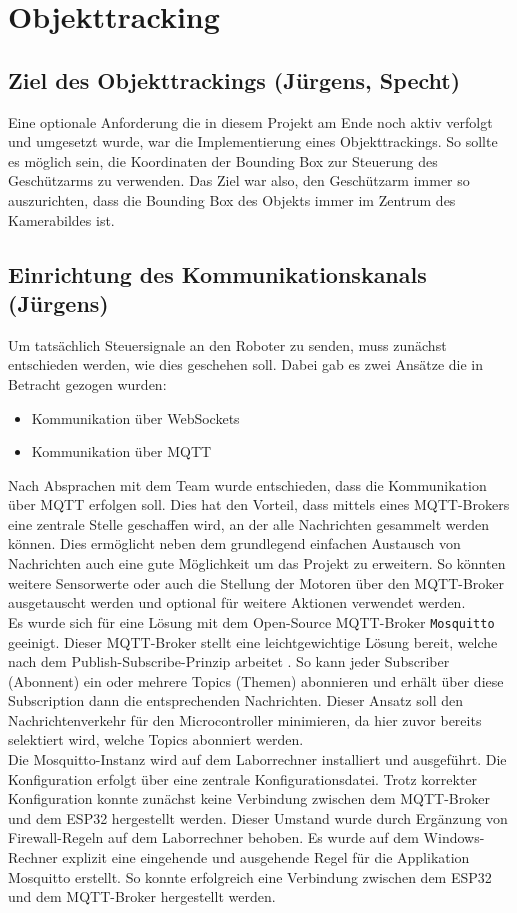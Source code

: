 \chapter{Objekttracking}
\section{Ziel des Objekttrackings (Jürgens, Specht)}
Eine optionale Anforderung die in diesem Projekt am Ende noch aktiv verfolgt und umgesetzt wurde, war die Implementierung eines Objekttrackings. So sollte es möglich sein, die Koordinaten der Bounding Box zur Steuerung des Geschützarms zu verwenden. Das Ziel war also, den Geschützarm immer so auszurichten, dass die Bounding Box des Objekts immer im Zentrum des Kamerabildes ist. 

\section{Einrichtung des Kommunikationskanals (Jürgens)}
Um tatsächlich Steuersignale an den Roboter zu senden, muss zunächst entschieden werden, wie dies geschehen soll. Dabei gab es zwei Ansätze die in Betracht gezogen wurden: 
\begin{itemize}
    \item Kommunikation über WebSockets
    \item Kommunikation über MQTT
\end{itemize}
Nach Absprachen mit dem Team wurde entschieden, dass die Kommunikation über MQTT erfolgen soll. Dies hat den Vorteil, dass mittels eines MQTT-Brokers eine zentrale Stelle geschaffen wird, an der alle Nachrichten gesammelt werden können. Dies ermöglicht neben dem grundlegend einfachen Austausch von Nachrichten auch eine gute Möglichkeit um das Projekt zu erweitern. So könnten weitere Sensorwerte oder auch die Stellung der Motoren über den MQTT-Broker ausgetauscht werden und optional für weitere Aktionen verwendet werden. \\

Es wurde sich für eine Lösung mit dem Open-Source MQTT-Broker \texttt{Mosquitto} geeinigt. Dieser MQTT-Broker stellt eine leichtgewichtige Lösung bereit, welche nach dem Publish-Subscribe-Prinzip arbeitet \cite{Mosquitto}. So kann jeder Subscriber (Abonnent) ein oder mehrere Topics (Themen) abonnieren und erhält über diese Subscription dann die entsprechenden Nachrichten. Dieser Ansatz soll den Nachrichtenverkehr für den Microcontroller minimieren, da hier zuvor bereits selektiert wird, welche Topics abonniert werden. 
\\ 
Die Mosquitto-Instanz wird auf dem Laborrechner installiert und ausgeführt. Die Konfiguration erfolgt über eine zentrale Konfigurationsdatei. Trotz korrekter Konfiguration konnte zunächst keine Verbindung zwischen dem MQTT-Broker und dem ESP32 hergestellt werden. Dieser Umstand wurde durch Ergänzung von Firewall-Regeln auf dem Laborrechner behoben. Es wurde auf dem Windows-Rechner explizit eine eingehende und ausgehende Regel für die Applikation Mosquitto erstellt. So konnte erfolgreich eine Verbindung zwischen dem ESP32 und dem MQTT-Broker hergestellt werden.

